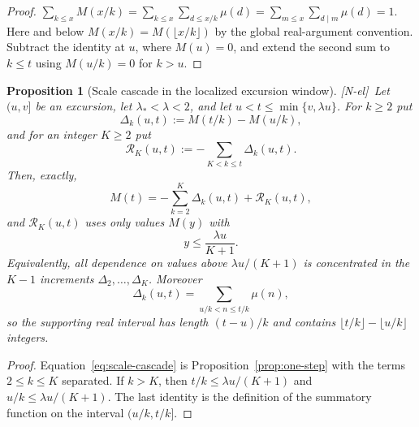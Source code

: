 \documentclass[11pt,reqno]{amsart}
\numberwithin{equation}{section}
\theoremstyle{plain}
\newtheorem{proposition}[theorem]{Proposition}
\theoremstyle{definition}
\theoremstyle{remark}
\newcommand{\tagNE}{\textup{[N-el]}}
\begin{document}
\begin{proof}
$\sum_{k\le x}M(x/k)=\sum_{k\le x}\sum_{d\le x/k}\mu(d)
=\sum_{m\le x}\sum_{d\mid m}\mu(d)=1$. Here and below
$M(x/k)=M(\lfloor x/k\rfloor)$ by the global real-argument convention.
Subtract the identity at $u$, where $M(u)=0$, and extend the second sum to
$k\le t$ using $M(u/k)=0$ for $k>u$.
\end{proof}

\begin{proposition}[Scale cascade in the localized excursion window]
\label{prop:scale-cascade}
\tagNE\ Let $(u,v]$ be an excursion, let $\lambda_*<\lambda<2$, and let
$u<t\le\min\{v,\lambda u\}$.  For $k\ge2$ put
\begin{equation}
\Delta_k(u,t):=M(t/k)-M(u/k),
\end{equation}
and for an integer $K\ge2$ put
\begin{equation}
\mathcal R_K(u,t):=-\sum_{K<k\le t}\Delta_k(u,t).
\end{equation}
Then, exactly,
\begin{equation}
\label{eq:scale-cascade}
M(t)=-\sum_{k=2}^{K}\Delta_k(u,t)+\mathcal R_K(u,t),
\end{equation}
and $\mathcal R_K(u,t)$ uses only values $M(y)$ with
\begin{equation}
y\le\frac{\lambda u}{K+1}.
\end{equation}
Equivalently, all dependence on values above $\lambda u/(K+1)$ is
concentrated in the $K-1$ increments
$\Delta_2,\ldots,\Delta_K$.  Moreover
\begin{equation}
\Delta_k(u,t)=\sum_{u/k<n\le t/k}\mu(n),
\end{equation}
so the supporting real interval has length $(t-u)/k$ and contains $\lfloor t/k\rfloor-\lfloor u/k\rfloor$ integers.
\end{proposition}

\begin{proof}
Equation~\eqref{eq:scale-cascade} is Proposition~\ref{prop:one-step} with
the terms $2\le k\le K$ separated.  If $k>K$, then
$t/k\le\lambda u/(K+1)$ and $u/k\le\lambda u/(K+1)$.  The last identity is
the definition of the summatory function on the interval $(u/k,t/k]$.
\end{proof}
\end{document}
